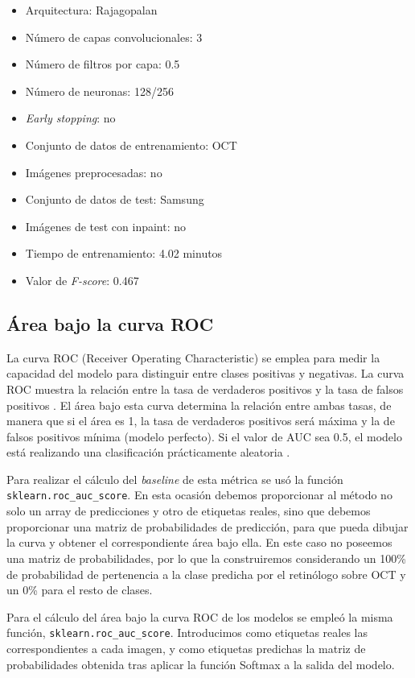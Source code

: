 \begin{itemize}
    \item Arquitectura: Rajagopalan
    \item Número de capas convolucionales: 3
    \item Número de filtros por capa: 0.5
    \item Número de neuronas: 128/256
    \item \textit{Early stopping}: no
    \item Conjunto de datos de entrenamiento: OCT
    \item Imágenes preprocesadas: no
    \item Conjunto de datos de test: Samsung
    \item Imágenes de test con inpaint: no
    \item Tiempo de entrenamiento: 4.02 minutos
    \item Valor de \textit{F-score}: 0.467
\end{itemize}

\subsection{Área bajo la curva ROC}

La curva ROC (Receiver Operating Characteristic) se emplea para medir la capacidad del modelo para distinguir entre clases positivas y negativas. La curva ROC muestra la relación entre la tasa de verdaderos positivos y la tasa de falsos positivos \cite{sklearn:auc}. El área bajo esta curva determina la relación entre ambas tasas, de manera que si el área es 1, la tasa de verdaderos positivos será máxima y la de falsos positivos mínima (modelo perfecto). Si el valor de AUC sea 0.5, el modelo está realizando una clasificación prácticamente aleatoria \cite{sklearn:auc, metrics:inbal}.

Para realizar el cálculo del \textit{baseline} de esta métrica se usó la función \texttt{sklearn.roc\_auc\_score}. En esta ocasión debemos proporcionar al método no solo un array de predicciones y otro de etiquetas reales, sino que debemos proporcionar una matriz de probabilidades de predicción, para que pueda dibujar la curva y obtener el correspondiente área bajo ella. En este caso no poseemos una matriz de probabilidades, por lo que la construiremos considerando un 100\% de probabilidad de pertenencia a la clase predicha por el retinólogo sobre OCT y un 0\% para el resto de clases.

Para el cálculo del área bajo la curva ROC de los modelos se empleó la misma función, \texttt{sklearn.roc\_auc\_score}. Introducimos como etiquetas reales las correspondientes a cada imagen, y como etiquetas predichas la matriz de probabilidades obtenida tras aplicar la función Softmax a la salida del modelo.

